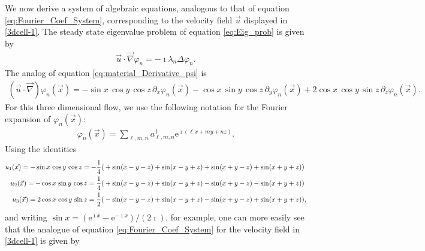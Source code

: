 \documentclass[11pt]{amsart}
\newcommand{\e}{\mathrm{e}}
\begin{document}

We now derive a system of algebraic equations, analogous to that of
equation \eqref{eq:Fourier_Coef_System}, corresponding to the velocity
field $\vec{u}$ displayed in \eqref{3dcell-1}. The steady state
eigenvalue problem of equation \eqref{eq:Eig_prob} is given by
%
\begin{align}\label{eq:Steady_Eig_prob}
  \vec{u}\cdot\vec{\nabla}\varphi_n=-\imath\lambda_n\Delta\varphi_n.
\end{align}
%
The analog of equation \eqref{eq:material_Derivative_psi} is
%
\begin{align}\label{eq:Steady_material_Derivative_psi}
  (\vec{u}\cdot\vec{\nabla})\varphi_n(\vec{x})=
         -\sin{x}\,\cos{y}\,\cos{z}\,\partial_x\varphi_n(\vec{x})
         -\cos{x}\,\sin{y}\,\cos{z}\,\partial_y\varphi_n(\vec{x})
         +2\cos{x}\,\cos{y}\,\sin{z}\,\partial_z\varphi_n(\vec{x}).
\end{align}
%
For this three dimensional flow, we use the following notation for the
Fourier expansion of $\varphi_n(\vec{x})$:
%
\begin{align}
  \varphi_n(\vec{x})=\sum_{\ell,m,n}a^{\,l}_{\ell,m,n}\e^{\imath (\ell x+my+nz)}.
\end{align}
%
Using the identities
%
\begin{align}\label{eq:Velocity_Field_3D}
  u_1(\vec{x})=-\sin{x}\,\cos{y}\,\cos{z}
     =-\frac{1}{4}(&+\sin(x-y-z)+\sin(x-y+z)+\sin(x+y-z)+\sin(x+y+z))
     \notag\\
  u_2(\vec{x})=-\cos{x}\,\sin{y}\,\cos{z}
     =\frac{1}{4}(&+\sin(x-y-z)+\sin(x-y+z)-\sin(x+y-z)-\sin(x+y+z))
     \notag\\
  u_3(\vec{x})=2\cos{x}\,\cos{y}\,\sin{z}
     =\frac{1}{2}(&-\sin(x-y-z)+\sin(x-y+z)-\sin(x+y-z)+\sin(x+y+z)),   
\end{align}
%
and writing $\sin{x}=(\e^{\imath x}-\e^{-\imath x})/(2\imath)$, for example, one can
more easily see that the analogue of equation
\eqref{eq:Fourier_Coef_System} for the velocity field in
\eqref{3dcell-1} is given by 
%
\end{document}
